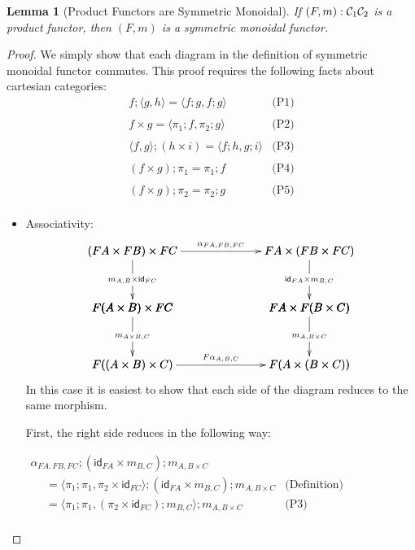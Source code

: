 \documentclass{article}
\let\to\relax
\newcommand{\to}{\rightarrow}
\newcommand{\cat}[1]{\mathcal{#1}}
\newcommand{\id}[0]{\mathsf{id}}
\newtheorem{lemma}[theorem]{Lemma}
\begin{document}
\begin{lemma}[Product Functors are Symmetric Monoidal]
  \label{lemma:product_functors_are_symmetric_monoidal}
  If $(F,m) : \cat{C}_1 \to \cat{C}_2$ is a product functor, then
  $(F,m)$ is a symmetric monoidal functor.
\end{lemma}
\begin{proof}
  We simply show that each diagram in the definition of symmetric
  monoidal functor commutes.  This proof requires the following facts
  about cartesian categories:
  \[
  \begin{array}{lll}
    f;\langle g , h \rangle = \langle f;g, f;g \rangle & \text{(P1)}\\
    \\
    f \times g = \langle \pi_1;f , \pi_2;g \rangle & \text{(P2)}\\
    \\
    \langle f , g \rangle;(h \times i) = \langle f;h, g;i \rangle & \text{(P3)}\\
    \\
    (f \times g);\pi_1 = \pi_1;f & \text{(P4)}\\
    \\
    (f \times g);\pi_2 = \pi_2;g & \text{(P5)}\\
  \end{array}
  \]
  \begin{itemize}
  \item[] Associativity:\ \\
    \[
    \bfig
    \vSquares|ammmmma|/->`->`->``->`->`->/[
      (FA \times FB) \times FC`
      FA \times (FB \times FC)`
      F(A \times B) \times FC`
      FA \times F(B \times C)`
      F((A \times B) \times C)`
      F(A \times (B \times C));
      {\alpha}_{FA,FB,FC}`
      m_{A,B} \times \id_{FC}`
      \id_{FA} \times m_{B,C}``
      m_{A \times B,C}`
      m_{A,B \times C}`
      F{\alpha}_{A,B,C}]
    \efig
    \]
    In this case it is easiest to show that each side of the diagram
    reduces to the same morphism.

    First, the right side reduces in the following way:
    \begin{center}
      \begin{math}
        \begin{array}{lll}
          \alpha_{FA,FB,FC};(\id_{FA} \times m_{B,C});m_{A,B \times C} \\
          \,\,\,\,\,\,\,\,= \langle \pi_1;\pi_1, \pi_2 \times \id_{FC} \rangle;(\id_{FA} \times m_{B,C});m_{A,B \times C} & \text{(Definition)}\\
          \,\,\,\,\,\,\,\,= \langle \pi_1;\pi_1, (\pi_2 \times \id_{FC});m_{B,C} \rangle;m_{A,B \times C} & \text{(P3)}\\
        \end{array}
      \end{math}
    \end{center}


\end{itemize}
\end{proof}
\end{document}

